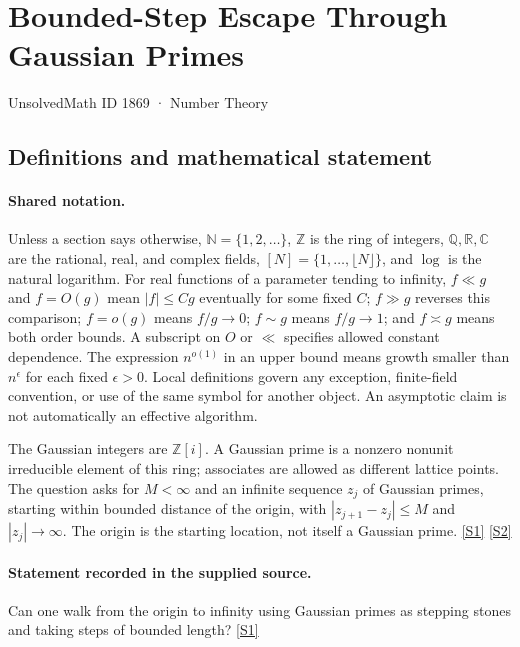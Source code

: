 \documentclass[11pt,a4paper]{article}
\newcommand{\N}{\mathbb{N}}
\newcommand{\Z}{\mathbb{Z}}
\newcommand{\Q}{\mathbb{Q}}
\newcommand{\R}{\mathbb{R}}
\newcommand{\C}{\mathbb{C}}
\newcommand{\sref}[2]{\hyperlink{source:#1:#2}{[S#2]}}
\begin{document}

\setcounter{section}{1868}

\section{Bounded-Step Escape Through Gaussian Primes}\label{1869}

{\small\sffamily UnsolvedMath ID 1869 · Number Theory}

\subsection{Definitions and mathematical statement}

\paragraph{Shared notation.}Unless a section says otherwise, $\N=\{1,2,\ldots\}$,
$\Z$ is the ring of integers, $\Q,\R,\C$ are the rational, real, and complex
fields, $[N]=\{1,\ldots,\lfloor N\rfloor\}$, and $\log$ is the natural
logarithm. For real functions of a parameter tending to infinity,
$f\ll g$ and $f=O(g)$ mean $|f|\leq Cg$ eventually for some fixed $C$;
$f\gg g$ reverses this comparison; $f=o(g)$ means $f/g\to0$;
$f\sim g$ means $f/g\to1$; and $f\asymp g$ means both order bounds.
A subscript on $O$ or $\ll$ specifies allowed constant dependence.
The expression $n^{o(1)}$ in an upper bound means growth smaller than
$n^\epsilon$ for each fixed $\epsilon>0$. Local definitions govern any
exception, finite-field convention, or use of the same symbol for another
object. An asymptotic claim is not automatically an effective algorithm.



The Gaussian integers are $\Z[i]$. A Gaussian prime is a nonzero nonunit irreducible element of this ring; associates are allowed as different lattice points. The question asks for $M<\infty$ and an infinite sequence $z_j$ of Gaussian primes, starting within bounded distance of the origin, with $|z_{j+1}-z_j|\leq M$ and $|z_j|\to\infty$. The origin is the starting location, not itself a Gaussian prime. \sref{1869}{1} \sref{1869}{2}

\paragraph{Statement recorded in the supplied source.}
Can one walk from the origin to infinity using Gaussian primes as stepping stones and taking steps of bounded length? \sref{1869}{1}
\end{document}
